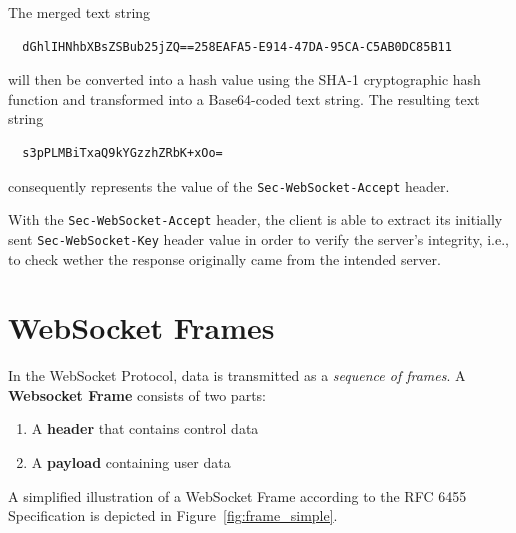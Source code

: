 \documentclass[a4paper, justified, notoc]{tufte-handout} %
\begin{document}
The merged text string 
\begin{Verbatim}
  dGhlIHNhbXBsZSBub25jZQ==258EAFA5-E914-47DA-95CA-C5AB0DC85B11
\end{Verbatim}
will then be converted into a hash value using the SHA-1 cryptographic hash function and transformed into a Base64-coded text string. The resulting text string
\begin{Verbatim}
  s3pPLMBiTxaQ9kYGzzhZRbK+xOo=
\end{Verbatim}
consequently represents the value of the \texttt{Sec-WebSocket-Accept} header.

With the \texttt{Sec-WebSocket-Accept} header, the client is able to extract its initially sent \texttt{Sec-WebSocket-Key} header value in order to verify the server's integrity, i.e., to check wether the response originally came from the intended server.



\section{WebSocket Frames} %
\label{sec:the_dataframe}

In the WebSocket Protocol, data is transmitted as a \emph{sequence of frames}. A \textbf{Websocket Frame} consists of two parts:
\begin{enumerate}
	\item A \textbf{header} that contains control data
	\item A \textbf{payload} containing user data
\end{enumerate}
A simplified illustration of a WebSocket Frame according to the RFC 6455 Specification is depicted in Figure~\ref{fig:frame_simple}.
\end{document}
